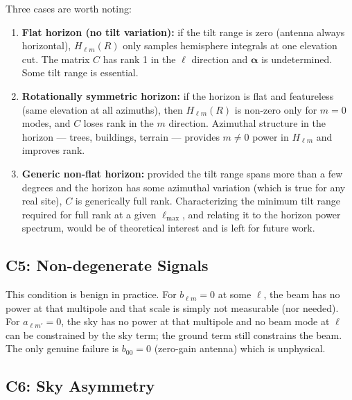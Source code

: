 \documentclass{aastex631}
\newcommand{\Hlm}{H_{\ell m}}
\newcommand{\lmax}{\ell_\mathrm{max}}
\theoremstyle{plain}
\theoremstyle{remark}
\begin{document}
Three cases are worth noting:

\begin{enumerate}
  \item \textbf{Flat horizon (no tilt variation):} if the tilt range
    is zero (antenna always horizontal), $\Hlm(R)$ only samples
    hemisphere integrals at one elevation cut.
    The matrix $C$ has rank 1 in the $\ell$ direction and
    $\boldsymbol{\alpha}$ is undetermined.
    Some tilt range is essential.

  \item \textbf{Rotationally symmetric horizon:} if the horizon is
    flat and featureless (same elevation at all azimuths), then
    $\Hlm(R)$ is non-zero only for $m=0$ modes, and $C$ loses rank
    in the $m$ direction.
    Azimuthal structure in the horizon --- trees, buildings, terrain
    --- provides $m \neq 0$ power in $\Hlm$ and improves rank.

  \item \textbf{Generic non-flat horizon:} provided the tilt range
    spans more than a few degrees and the horizon has some azimuthal
    variation (which is true for any real site), $C$ is generically
    full rank.
    Characterizing the minimum tilt range required for full rank at
    a given $\lmax$, and relating it to the horizon power spectrum,
    would be of theoretical interest and is left for future work.
\end{enumerate}

\subsection{C5: Non-degenerate Signals}

This condition is benign in practice.
For $b_{\ell m} = 0$ at some $\ell$, the beam has no power at that
multipole and that scale is simply not measurable (nor needed).
For $a_{\ell m'} = 0$, the sky has no power at that multipole and
no beam mode at $\ell$ can be constrained by the sky term; the
ground term still constrains the beam.
The only genuine failure is $b_{00} = 0$ (zero-gain antenna) which
is unphysical.

\subsection{C6: Sky Asymmetry}
\label{sec:skyasym}
\end{document}
